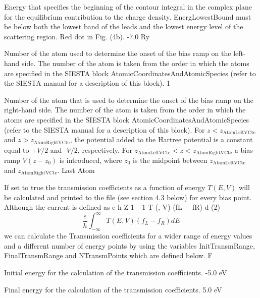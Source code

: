 \documentclass[11pt]{article}
\begin{document}
{Energy that specifies the beginning of the contour integral in the complex plane for the equilibrium contribution to the charge density. EnergLowestBound must be below both the lowest band of the leads and the lowest energy level of the scattering region. Red dot in Fig. (4b).}
{-7.0 Ry}

{Number of the atom used to determine the onset of the bias ramp on the left-hand side.  The number of the atom is taken from the order in which the atoms are specified in the SIESTA block AtomicCoordinatesAndAtomicSpecies (refer to the SIESTA manual for a description of this block).}
{1}

{Number of the atom that is used to determine the onset of the bias ramp on the right-hand side. The number of the atom is taken from the order in which the atoms are specified in the SIESTA block AtomicCoordinatesAndAtomicSpecies (refer to the SIESTA manual for a description of this block).  For $z < z_\mathrm{AtomLeftVCte}$ and $z > z_\mathrm{AtomRightVCte}$, the potential added to the Hartree potential is a constant equal to +$V/2$ and -$V/2$, respectively. For $z_\mathrm{AtomLeftVCte} < z < z_\mathrm{AtomRightVCte}$ a bias ramp $V (z - z_0)$ is introduced, where $z_0$ is the midpoint between $z_\mathrm{AtomLeftVCte}$ and $z_\mathrm{AtomRightVCte}$.}
{Last Atom}

{If set to true the transmission coefficients as a function of energy $T(E,V)$ will be calculated and printed to the file  (see section 4.3 below) for every bias point.  Although the current is defined as
e h Z 1 −1 T (, V) (fL − fR) d (2)
\begin{equation}
\frac{e}{h}\int_{-\infty}^{\infty}T(E,V)\left(f_L-f_R\right)dE
\end{equation}
we can calculate the Transmission coefficients for a wider range of energy values and a different number of energy points by using the variables InitTransmRange, FinalTransmRange and NTransmPoints which are defined below.}
{F}

{Initial energy for the calculation of the transmission coefficients.}
{-5.0 eV}

{Final energy for the calculation of the transmission coefficients.}
{5.0 eV}
\end{document}
